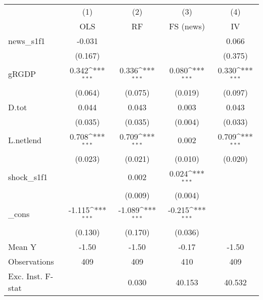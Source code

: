 {
\def\sym#1{\ifmmode^{#1}\else\(^{#1}\)\fi}
\begin{tabular}{l*{4}{c}}
\toprule
            &\multicolumn{1}{c}{(1)}&\multicolumn{1}{c}{(2)}&\multicolumn{1}{c}{(3)}&\multicolumn{1}{c}{(4)}\\
            &\multicolumn{1}{c}{OLS}&\multicolumn{1}{c}{RF}&\multicolumn{1}{c}{FS (news)}&\multicolumn{1}{c}{IV}\\
\midrule
news\_s1f1   &      -0.031         &                     &                     &       0.066         \\
            &     (0.167)         &                     &                     &     (0.375)         \\
\addlinespace
gRGDP       &       0.342\sym{***}&       0.336\sym{***}&       0.080\sym{***}&       0.330\sym{***}\\
            &     (0.064)         &     (0.075)         &     (0.019)         &     (0.097)         \\
\addlinespace
D.tot       &       0.044         &       0.043         &       0.003         &       0.043         \\
            &     (0.035)         &     (0.035)         &     (0.004)         &     (0.033)         \\
\addlinespace
L.netlend   &       0.708\sym{***}&       0.709\sym{***}&       0.002         &       0.709\sym{***}\\
            &     (0.023)         &     (0.021)         &     (0.010)         &     (0.020)         \\
\addlinespace
shock\_s1f1  &                     &       0.002         &       0.024\sym{***}&                     \\
            &                     &     (0.009)         &     (0.004)         &                     \\
\addlinespace
\_cons      &      -1.115\sym{***}&      -1.089\sym{***}&      -0.215\sym{***}&                     \\
            &     (0.130)         &     (0.170)         &     (0.036)         &                     \\
\midrule
Mean Y      &       -1.50         &       -1.50         &       -0.17         &       -1.50         \\
Observations&         409         &         409         &         410         &         409         \\
Exc. Inst. F-stat&                     &       0.030         &      40.153         &      40.532         \\
\bottomrule
\end{tabular}
}
